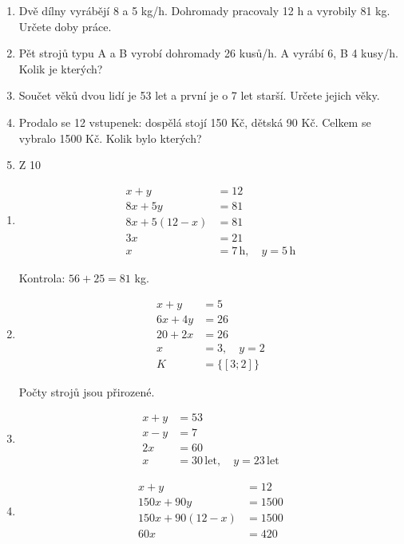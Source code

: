 \documentclass[11pt,a4paper]{article}
\begin{document}
\begin{zadaniReseniBox}[title={Domácí úkol}]
\begin{enumerate}[label=\alph*),itemsep=2pt]
\item Dvě dílny vyrábějí 8 a 5 kg/h. Dohromady pracovaly 12 h a vyrobily 81 kg. Určete doby práce.
\item Pět strojů typu A a B vyrobí dohromady 26 kusů/h. A vyrábí 6, B 4 kusy/h. Kolik je kterých?
\item Součet věků dvou lidí je 53 let a první je o 7 let starší. Určete jejich věky.
\item Prodalo se 12 vstupenek: dospělá stojí 150 Kč, dětská 90 Kč. Celkem se vybralo 1500 Kč. Kolik bylo kterých?
\item Z 10%
\end{enumerate}
\tcblower
\begin{enumerate}[label=\alph*),itemsep=1pt]
\item
\[\begin{aligned}
x+y&=12 \\
8x+5y&=81 \\
8x+5(12-x)&=81 \\
3x&=21 \\
x&=7\,\mathrm h,\quad y=5\,\mathrm h
\end{aligned}\]\par Kontrola: $56+25=81$ kg.
\item
\[\begin{aligned}
x+y&=5 \\
6x+4y&=26 \\
20+2x&=26 \\
x&=3,\quad y=2 \\
K&=\{[3;2]\}
\end{aligned}\]\par Počty strojů jsou přirozené.
\item
\[\begin{aligned}
x+y&=53 \\
x-y&=7 \\
2x&=60 \\
x&=30\,\mathrm{let},\quad y=23\,\mathrm{let}
\end{aligned}\]
\item
\[\begin{aligned}
x+y&=12 \\
150x+90y&=1500 \\
150x+90(12-x)&=1500 \\
60x&=420 \\

\end{aligned}\]
\end{enumerate}
\end{zadaniReseniBox}
\end{document}
